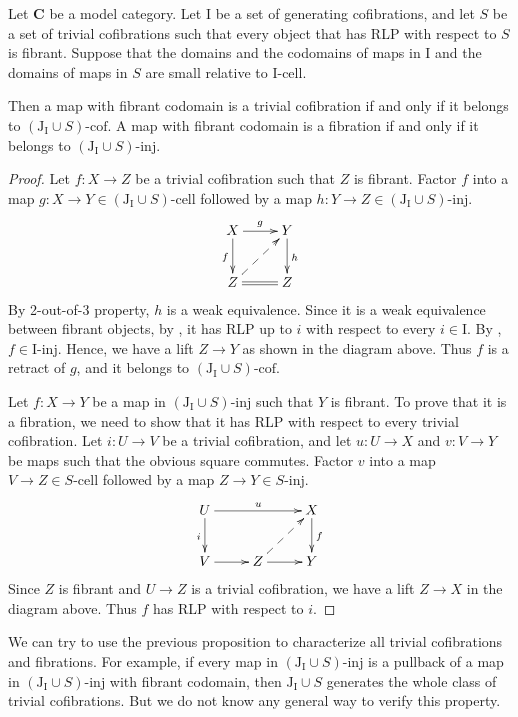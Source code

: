 \documentclass[reqno]{amsart}
\theoremstyle{definition}
\newcommand{\cat}[1]{\mathbf{#1}}
\newcommand{\C}{\cat{C}}
\newcommand{\I}{\mathrm{I}}
\newcommand{\J}{\mathrm{J}}
\newcommand{\class}[2]{#1\text{-}\mathrm{#2}}
\newcommand{\Iinj}[1][\I]{\class{#1}{inj}}
\newcommand{\Icell}[1][\I]{\class{#1}{cell}}
\newcommand{\Icof}[1][\I]{\class{#1}{cof}}
\begin{document}
\begin{prop}
Let $\C$ be a model category.
Let $\I$ be a set of generating cofibrations, and let $S$ be a set of trivial cofibrations
such that every object that has RLP with respect to $S$ is fibrant.
Suppose that the domains and the codomains of maps in $\I$ and the domains of maps in $S$ are small relative to $\Icell$.

Then a map with fibrant codomain is a trivial cofibration if and only if it belongs to $\Icof[(\J_\I \cup S)]$.
A map with fibrant codomain is a fibration if and only if it belongs to $\Iinj[(\J_\I \cup S)]$.
\end{prop}
\begin{proof}
Let $f : X \to Z$ be a trivial cofibration such that $Z$ is fibrant.
Factor $f$ into a map $g : X \to Y \in \Icell[(\J_\I \cup S)]$ followed by a map $h : Y \to Z \in \Iinj[(\J_\I \cup S)]$.
\[ \xymatrix{ X \ar[r]^g \ar[d]_f & Y \ar[d]^h \\
              Z \ar@{=}[r] \ar@{-->}[ur] & Z
            } \]
By 2-out-of-3 property, $h$ is a weak equivalence.
Since it is a weak equivalence between fibrant objects, by , it has RLP up to $i$ with respect to every $i \in \I$.
By , $f \in \Iinj$.
Hence, we have a lift $Z \to Y$ as shown in the diagram above.
Thus $f$ is a retract of $g$, and it belongs to $\Icof[(\J_\I \cup S)]$.

Let $f : X \to Y$ be a map in $\Iinj[(\J_\I \cup S)]$ such that $Y$ is fibrant.
To prove that it is a fibration, we need to show that it has RLP with respect to every trivial cofibration.
Let $i : U \to V$ be a trivial cofibration, and let $u : U \to X$ and $v : V \to Y$ be maps such that the obvious square commutes.
Factor $v$ into a map $V \to Z \in \Icell[S]$ followed by a map $Z \to Y \in \Iinj[S]$.
\[ \xymatrix{ U \ar[rr]^u \ar[d]_i & & X \ar[d]^f \\
              V \ar[r] & Z \ar[r] \ar@{-->}[ur] & Y
            } \]
Since $Z$ is fibrant and $U \to Z$ is a trivial cofibration, we have a lift $Z \to X$ in the diagram above.
Thus $f$ has RLP with respect to $i$.
\end{proof}

We can try to use the previous proposition to characterize all trivial cofibrations and fibrations.
For example, if every map in $\Iinj[(\J_\I \cup S)]$ is a pullback of a map in $\Iinj[(\J_\I \cup S)]$ with fibrant codomain,
then $\J_\I \cup S$ generates the whole class of trivial cofibrations.
But we do not know any general way to verify this property.
\end{document}
